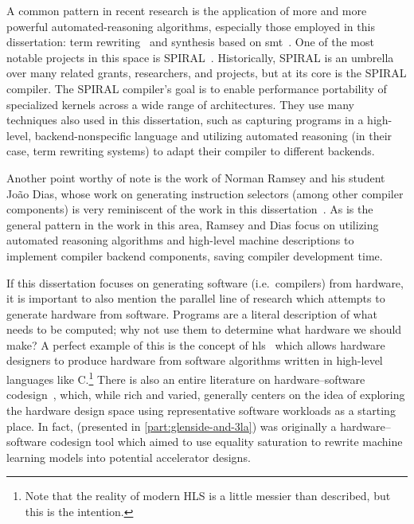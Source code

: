 A common pattern in recent research
  is the application
  of more and more powerful
  \gls{automated-reasoning} algorithms,
  especially those employed in this dissertation:
  term rewriting~\cite{Richards2006VerificationOC,Despland1990UsingRT,Emmelmann1991CodeSB,Despland1990PAGODEAB,Daly2024EfficientlySL} and 
  synthesis based on \gls{smt}~\cite{Daly2024EfficientlySL}.
One of the most notable projects
  in this space
  is SPIRAL~\cite{franchetti2018spiral}. 
Historically,
  SPIRAL is an umbrella
  over many related grants,
  researchers, and projects,
  but at its core is the
  SPIRAL compiler.
The SPIRAL compiler's goal
  is to enable performance
  portability
  of specialized kernels
  across a wide range of architectures.
They use many techniques
  also used in this dissertation,
  such as
  capturing programs in a high-level,
  backend-nonspecific language
  and
  utilizing automated reasoning 
  (in their case, term rewriting systems)
  to adapt their compiler
  to different backends.


Another point worthy of note
  is the work of Norman Ramsey
  and his student Jo\~{a}o Dias,
  whose work on generating
  instruction selectors
  (among other compiler components)
  is very reminiscent
  of the work in this dissertation~\cite{
  ramsey2003pragmatic,
  ramsey2011resourceable,
  dias2010automatically}.
As is the general pattern
  in the work in this area,
  Ramsey and Dias
  focus on utilizing automated reasoning algorithms
  and high-level machine descriptions
  to implement compiler backend components,
  saving compiler development time.


If this dissertation focuses on
  generating software (i.e.~compilers)
  from hardware,
  it is important to also mention
  the parallel line of research
  which attempts to generate hardware from software.
Programs are a literal description
  of what needs to be computed;
  why not use them to determine
  what hardware we should make?
A perfect example of this is
  the concept of \gls{hls}~\cite{cong2011high,cong2022fpga}
  which allows hardware designers to produce hardware
  from
  software algorithms
  written in high-level languages like C.\footnote{
Note that the reality of modern HLS
  is a little messier than described,
  but this is the intention.
}
There is also an entire literature on
  hardware--software codesign~\cite{teich2012hardware,kokila2016survey,schaumont2012practical,wolf2003decade,Gupta1993HardwaresoftwareCF},
  which, while rich and varied,
  generally centers on the idea
  of exploring the hardware design space
  using representative software workloads
  as a starting place.
In fact,
  \g (presented in \cref{part:glenside-and-3la})
  was originally a
  hardware--software codesign tool
  which aimed to use equality saturation
  to rewrite machine learning models
  into potential accelerator designs.

